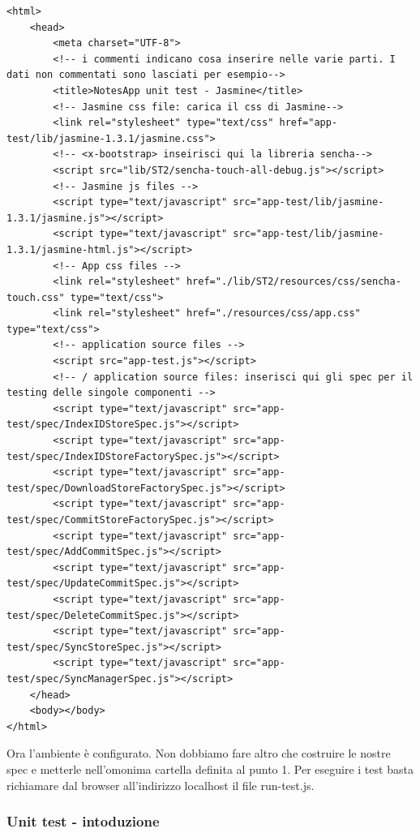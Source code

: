 \documentclass[10pt,a4paper,onecolumn]{article}
\begin{document}
\begin{lstlisting}
<html>
	<head>
		<meta charset="UTF-8">
		<!-- i commenti indicano cosa inserire nelle varie parti. I dati non commentati sono lasciati per esempio-->
		<title>NotesApp unit test - Jasmine</title>
		<!-- Jasmine css file: carica il css di Jasmine-->
		<link rel="stylesheet" type="text/css" href="app-test/lib/jasmine-1.3.1/jasmine.css">
		<!-- <x-bootstrap> inseirisci qui la libreria sencha-->
		<script src="lib/ST2/sencha-touch-all-debug.js"></script>
		<!-- Jasmine js files -->
		<script type="text/javascript" src="app-test/lib/jasmine-1.3.1/jasmine.js"></script>
		<script type="text/javascript" src="app-test/lib/jasmine-1.3.1/jasmine-html.js"></script>
		<!-- App css files -->
		<link rel="stylesheet" href="./lib/ST2/resources/css/sencha-touch.css" type="text/css">
		<link rel="stylesheet" href="./resources/css/app.css" type="text/css">
		<!-- application source files -->
		<script src="app-test.js"></script>
		<!-- / application source files: inserisci qui gli spec per il testing delle singole componenti -->
		<script type="text/javascript" src="app-test/spec/IndexIDStoreSpec.js"></script>
		<script type="text/javascript" src="app-test/spec/IndexIDStoreFactorySpec.js"></script>
		<script type="text/javascript" src="app-test/spec/DownloadStoreFactorySpec.js"></script>
		<script type="text/javascript" src="app-test/spec/CommitStoreFactorySpec.js"></script>
		<script type="text/javascript" src="app-test/spec/AddCommitSpec.js"></script>
		<script type="text/javascript" src="app-test/spec/UpdateCommitSpec.js"></script>
		<script type="text/javascript" src="app-test/spec/DeleteCommitSpec.js"></script>
		<script type="text/javascript" src="app-test/spec/SyncStoreSpec.js"></script>
		<script type="text/javascript" src="app-test/spec/SyncManagerSpec.js"></script>
	</head>
	<body></body>
</html>
\end{lstlisting}

Ora l'ambiente è configurato. Non dobbiamo fare altro che costruire le nostre spec e metterle nell'omonima cartella definita al punto 1. Per eseguire i test basta richiamare dal browser all'indirizzo localhost il file run-test.js.

\subsubsection{Unit test - intoduzione}
\end{document}
